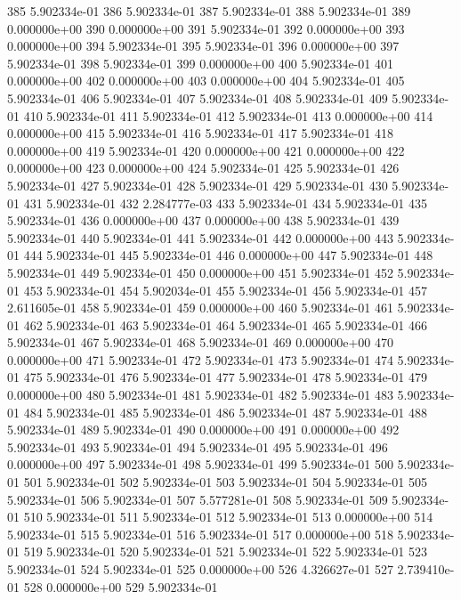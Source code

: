 \documentclass{article}
\begin{document}
\begin{Schunk}
\begin{Soutput}
385  5.902334e-01
386  5.902334e-01
387  5.902334e-01
388  5.902334e-01
389  0.000000e+00
390  0.000000e+00
391  5.902334e-01
392  0.000000e+00
393  0.000000e+00
394  5.902334e-01
395  5.902334e-01
396  0.000000e+00
397  5.902334e-01
398  5.902334e-01
399  0.000000e+00
400  5.902334e-01
401  0.000000e+00
402  0.000000e+00
403  0.000000e+00
404  5.902334e-01
405  5.902334e-01
406  5.902334e-01
407  5.902334e-01
408  5.902334e-01
409  5.902334e-01
410  5.902334e-01
411  5.902334e-01
412  5.902334e-01
413  0.000000e+00
414  0.000000e+00
415  5.902334e-01
416  5.902334e-01
417  5.902334e-01
418  0.000000e+00
419  5.902334e-01
420  0.000000e+00
421  0.000000e+00
422  0.000000e+00
423  0.000000e+00
424  5.902334e-01
425  5.902334e-01
426  5.902334e-01
427  5.902334e-01
428  5.902334e-01
429  5.902334e-01
430  5.902334e-01
431  5.902334e-01
432  2.284777e-03
433  5.902334e-01
434  5.902334e-01
435  5.902334e-01
436  0.000000e+00
437  0.000000e+00
438  5.902334e-01
439  5.902334e-01
440  5.902334e-01
441  5.902334e-01
442  0.000000e+00
443  5.902334e-01
444  5.902334e-01
445  5.902334e-01
446  0.000000e+00
447  5.902334e-01
448  5.902334e-01
449  5.902334e-01
450  0.000000e+00
451  5.902334e-01
452  5.902334e-01
453  5.902334e-01
454  5.902034e-01
455  5.902334e-01
456  5.902334e-01
457  2.611605e-01
458  5.902334e-01
459  0.000000e+00
460  5.902334e-01
461  5.902334e-01
462  5.902334e-01
463  5.902334e-01
464  5.902334e-01
465  5.902334e-01
466  5.902334e-01
467  5.902334e-01
468  5.902334e-01
469  0.000000e+00
470  0.000000e+00
471  5.902334e-01
472  5.902334e-01
473  5.902334e-01
474  5.902334e-01
475  5.902334e-01
476  5.902334e-01
477  5.902334e-01
478  5.902334e-01
479  0.000000e+00
480  5.902334e-01
481  5.902334e-01
482  5.902334e-01
483  5.902334e-01
484  5.902334e-01
485  5.902334e-01
486  5.902334e-01
487  5.902334e-01
488  5.902334e-01
489  5.902334e-01
490  0.000000e+00
491  0.000000e+00
492  5.902334e-01
493  5.902334e-01
494  5.902334e-01
495  5.902334e-01
496  0.000000e+00
497  5.902334e-01
498  5.902334e-01
499  5.902334e-01
500  5.902334e-01
501  5.902334e-01
502  5.902334e-01
503  5.902334e-01
504  5.902334e-01
505  5.902334e-01
506  5.902334e-01
507  5.577281e-01
508  5.902334e-01
509  5.902334e-01
510  5.902334e-01
511  5.902334e-01
512  5.902334e-01
513  0.000000e+00
514  5.902334e-01
515  5.902334e-01
516  5.902334e-01
517  0.000000e+00
518  5.902334e-01
519  5.902334e-01
520  5.902334e-01
521  5.902334e-01
522  5.902334e-01
523  5.902334e-01
524  5.902334e-01
525  0.000000e+00
526  4.326627e-01
527  2.739410e-01
528  0.000000e+00
529  5.902334e-01

\end{Soutput}
\end{Schunk}
\end{document}
